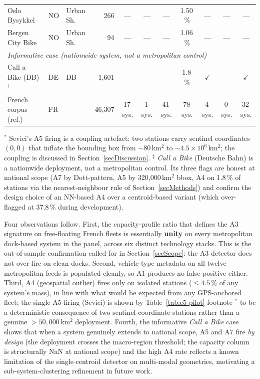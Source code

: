 \documentclass[11pt,a4paper]{article}
\begin{document}
\begin{table}[ht]
\begin{tabular}{@{}lllr@{\hskip 6pt}ccccccc@{}}
Oslo Bysykkel          & NO & Urban Sh. & 266  & --- & --- & --- & 1.50\,\% & --- & --- & --- \\
Bergen City Bike       & NO & Urban Sh. & 94   & --- & --- & --- & 1.06\,\% & --- & --- & --- \\
\midrule
\multicolumn{11}{l}{\emph{Informative case (nationwide system, not a metropolitan control)}}\\
Call a Bike (DB)$^\ddag$ & DE & DB & 1{,}601 & --- & --- & --- & 1.8\,\% & $\checkmark$ & --- & $\checkmark$ \\
\midrule
French corpus (ref.)   & FR & --- & 46{,}307 & 17\,sys. & 1\,sys. & 41\,sys. & 78\,sys. & 4\,sys. & 0\,sys. & 32\,sys. \\
\bottomrule
\end{tabular}

\medskip
{\footnotesize $^\ast$ Sevici's A5 firing is a coupling artefact:
two stations carry sentinel coordinates $(0, 0)$ that inflate the
bounding box from $\sim 80$\,km$^2$ to $\sim 4.5\times 10^6$\,km$^2$;
the coupling is discussed in Section~\ref{secDiscussion}.
$^\ddag$ \emph{Call a Bike} (Deutsche Bahn) is a nationwide
deployment, not a metropolitan control. Its three flags are
honest at national scope (A7 by Dott-pattern, A5 by 320{,}000\,km$^2$
bbox, A4 on 1.8\,\% of stations via the nearest-neighbour rule of
Section~\ref{secMethods}) and confirm the design choice of an
NN-based A4 over a centroid-based variant (which over-flagged at
$37.8\,\%$ during development).}
\end{table}

Four observations follow. First, the capacity-profile ratio that
defines the A3 signature on free-floating French fleets is
essentially \textbf{unity} on every metropolitan dock-based system
in the panel, across six distinct technology stacks. This is the
out-of-sample confirmation called for in
Section~\ref{secScope}: the A3 detector does not over-fire on
clean docks. Second, vehicle-type metadata on all twelve
metropolitan feeds is populated cleanly, so A1 produces no false
positive either. Third, A4 (geospatial outlier) fires only on
isolated stations ($\leq 4.5\,\%$ of any system's mass), in line
with what would be expected from any GPS-anchored fleet; the
single A5 firing (Sevici) is shown by Table~\ref{tab:e5-pilot}
footnote $^\ast$ to be a deterministic consequence of two
sentinel-coordinate stations rather than a genuine
$> 50{,}000$\,km$^2$ deployment. Fourth, the informative
\emph{Call a Bike} case shows that when a system genuinely
extends to national scope, A5 and A7 fire \emph{by design} (the
deployment crosses the macro-region threshold; the capacity
column is structurally NaN at national scope) and the high A4
rate reflects a known limitation of the single-centroid detector
on multi-modal geometries, motivating a sub-system-clustering
refinement in future work.
\end{document}
